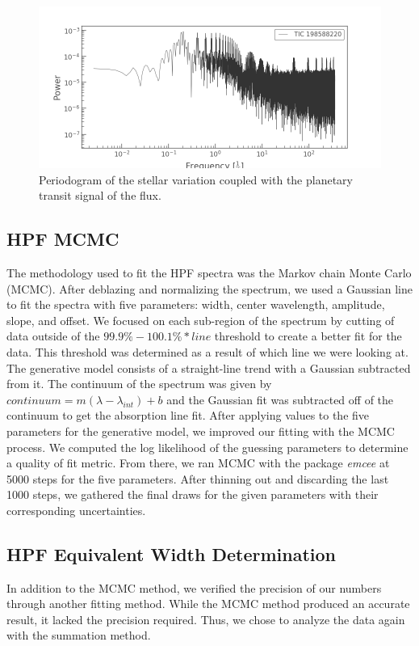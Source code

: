 \documentclass[twocolumn]{aastex631}
\begin{document}
\begin{figure}
    \includegraphics[width=\linewidth]{figures/planetary_periodogram.png}
    \caption{Periodogram of the stellar variation coupled with the planetary transit signal of the flux. }
    \label{fig:planetary_periodogram}
\end{figure}

\subsection{HPF MCMC}
The methodology used to fit the HPF spectra was the Markov chain Monte Carlo (MCMC). After deblazing and normalizing the spectrum, we used a Gaussian line to fit the spectra with five parameters: width, center wavelength, amplitude, slope, and offset.  We focused on each sub-region of the spectrum by cutting of data outside of the $99.9\%-100.1\%*line$ threshold to create a better fit for the data. This threshold was determined as a result of which line we were looking at. The generative model consists of a straight-line trend with a Gaussian subtracted from it. The continuum of the spectrum was given by $continuum=m(\lambda-\lambda_{int})+b$ and the Gaussian fit was subtracted off of the continuum to get the absorption line fit. After applying values to the five parameters for the generative model, we improved our fitting with the MCMC process. We computed the log likelihood of the guessing parameters to determine a quality of fit metric. From there, we ran MCMC with the package \textit{emcee} at 5000 steps for the five parameters. After thinning out and discarding the last 1000 steps, we gathered the final draws for the given parameters with their corresponding uncertainties.

\subsection{HPF Equivalent Width Determination}
In addition to the MCMC method, we verified the precision of our numbers through another fitting method. While the MCMC method produced an accurate result, it lacked the precision required. Thus, we chose to analyze the data again with the summation method.
\end{document}
